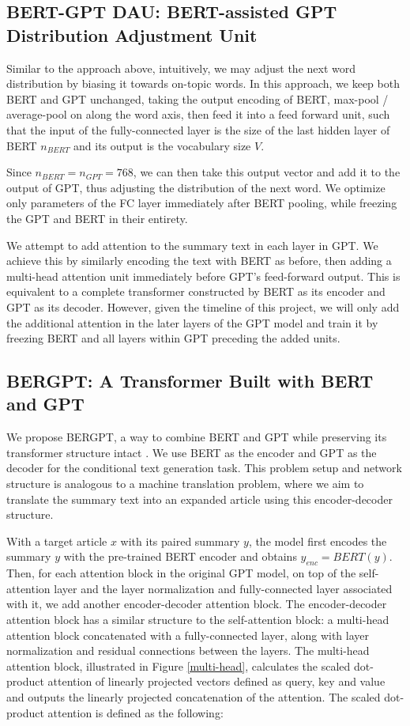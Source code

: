 \documentclass{article}
\begin{document}
\subsection{BERT-GPT DAU: BERT-assisted GPT Distribution Adjustment Unit}

Similar to the approach above, intuitively, we may adjust the next word distribution by biasing it towards on-topic words. In this approach, we keep both BERT and GPT unchanged, taking the output encoding of BERT, max-pool / average-pool on along the word axis, then feed it into a feed forward unit, such that the input of the fully-connected layer is the size of the last hidden layer of BERT $n_{BERT}$ and its output is the vocabulary size $V$. 

Since $n_{BERT} = n_{GPT} = 768$, we can then take this output vector and add it to the output of GPT, thus adjusting the distribution of the next word. We optimize only parameters of the FC layer immediately after BERT pooling, while freezing the GPT and BERT in their entirety.

We attempt to add attention to the summary text in each layer in GPT. We achieve this by similarly encoding the text with BERT as before, then adding a multi-head attention unit immediately before GPT's feed-forward output. This is equivalent to a complete transformer constructed by BERT as its encoder and GPT as its decoder. However, given the timeline of this project, we will only add the additional attention in the later layers of the GPT model and train it by freezing BERT and all layers within GPT preceding the added units.


\subsection{BERGPT: A Transformer Built with BERT and GPT}

We propose BERGPT, a way to combine BERT and GPT while preserving its transformer structure intact \cite{transformer}. We use BERT as the encoder and GPT as the decoder for the conditional text generation task. This problem setup and network structure is analogous to a machine translation problem, where we aim to translate the summary text into an expanded article using this encoder-decoder structure.

With a target article $x$ with its paired summary $y$, the model first encodes the summary $y$ with the pre-trained BERT encoder and obtains $y_{enc} = BERT(y)$. Then, for each attention block in the original GPT model, on top of the self-attention layer and the layer normalization and fully-connected layer associated with it, we add another encoder-decoder attention block. The encoder-decoder attention block has a similar structure to the self-attention block: a multi-head attention block concatenated with a fully-connected layer, along with layer normalization and residual connections between the layers. The multi-head attention block, illustrated in Figure \ref{multi-head}, calculates the scaled dot-product attention of linearly projected vectors defined as query, key and value and outputs the linearly projected concatenation of the attention. The scaled dot-product attention is defined as the following:
\end{document}
